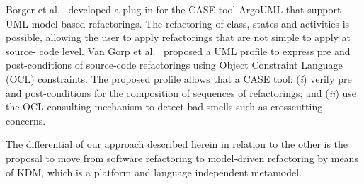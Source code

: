 Borger et al.~\cite{Boger2002} developed a plug-in for the CASE tool ArgoUML that support UML model-based refactorings. The refactoring of class, states and activities is possible, allowing the user to apply refactorings that are not simple to apply at source- code level. 
Van Gorp et al.~\cite{Gorp2003} proposed a UML profile to express pre and post-conditions of source-code refactorings using Object Constraint Language (OCL) constraints. The proposed profile allows that a CASE tool: (\textit{i}) verify pre and post-conditions for the composition of sequences of refactorings; and (\textit{ii}) use the OCL consulting mechanism to detect bad smells such as crosscutting concerns.

The differential of our approach described herein in relation to the other is the proposal to move from software refactoring to model-driven refactoring by means of KDM, which is a platform and language independent metamodel.
